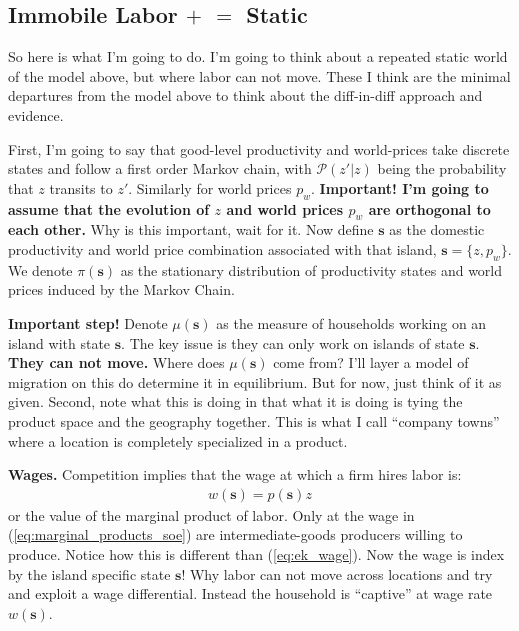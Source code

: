 \documentclass[pdftex,12pt]{article}
\begin{document}
\subsection{Immobile Labor $+$ \citet{eaton2002technology} $=$ Static \citet{lyon2019}}

So here is what I'm going to do. I'm going to think about a repeated static world of the model above, but where labor can not move. These I think are the minimal departures from the model above to think about the diff-in-diff approach and evidence.

\medskip
\noindent First, I'm going to say that good-level productivity and world-prices take discrete states and follow a first order Markov chain, with $\mathcal{P}(z'|z)$ being the probability that $z$ transits to $z'$. Similarly for world prices $p_w$. \textbf{ Important! I'm going to assume that the evolution of $z$ and world prices $p_w$ are orthogonal to each other.} Why is this important, wait for it. Now define $\textbf{s}$ as the domestic productivity and world price combination associated with that island, $\textbf{s} = \{z, p_w\}$. We denote $\pi(\textbf{s})$ as the stationary distribution of productivity states and world prices induced by the Markov Chain.

\medskip
\noindent \textbf{Important step!} Denote $\mu(\textbf{s})$ as the measure of households working on an island with state $\textbf{s}$. The key issue is they can only work on islands of state $\textbf{s}$. \textbf{They can not move.} Where does $\mu(\textbf{s})$ come from? I'll layer a model of migration on this do determine it in equilibrium. But for now, just think of it as given. Second, note what this is doing in that what it is doing is tying the product space and the geography together. This is what I call ``company towns'' where a location is completely specialized in a product.

\medskip
\noindent \textbf{Wages.} Competition implies that the wage at which a firm hires labor is:
\begin{align}
w(\textbf{s}) = p(\textbf{s}) z
\label{eq:marginal_products_soe}
\end{align}
or the value of the marginal product of labor. Only at the wage in (\ref{eq:marginal_products_soe}) are intermediate-goods producers willing to produce. Notice how this is different than (\ref{eq:ek_wage}). Now the wage is index by the island specific state $\textbf{s}$! Why labor can not move across locations and try and exploit a wage differential. Instead the household is ``captive'' at wage rate $w(\textbf{s})$. 
\end{document}
